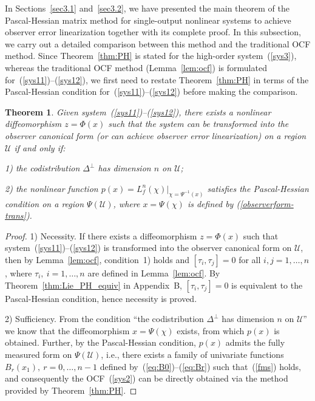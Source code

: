 \documentclass[11pt]{article}
\newtheorem{theorem}{Theorem}
\begin{document}
In Sections~\ref{sec3.1} and~\ref{sec3.2}, we have presented the main theorem of the Pascal-Hessian matrix method for single-output nonlinear systems to achieve observer error linearization together with its complete proof. In this subsection, we carry out a detailed comparison between this method and the traditional OCF method. Since Theorem~\ref{thm:PH} is stated for the high-order system~(\ref{sys3}), whereas the traditional OCF method (Lemma~\ref{lem:ocf}) is formulated for~(\ref{sys11})--(\ref{sys12}), we first need to restate Theorem~\ref{thm:PH} in terms of the Pascal-Hessian condition for~(\ref{sys11})--(\ref{sys12}) before making the comparison.
\begin{theorem}\label{thm:gene}
	Given system~(\ref{sys11})--(\ref{sys12}), there exists a nonlinear diffeomorphism $z=\Phi(x)$ such that the system can be transformed into the observer canonical form (or can achieve observer error linearization) on a region $\mathcal{U}$ if and only if: 
	
	1) the codistribution $\Delta^\perp$ has dimension $n$ on $\mathcal{U}$; 
	
	2) the nonlinear function $p(x)=L_f^n(\chi)\big|_{\chi=\Psi^{-1}(x)}$ satisfies the Pascal-Hessian condition on a region $\Psi(\mathcal{U})$, where $x=\Psi(\chi)$ is defined by (\ref{observerform-trans}).
\end{theorem}

\begin{proof}
	1) Necessity. If there exists a diffeomorphism $z=\Phi(x)$ such that system~(\ref{sys11})--(\ref{sys12}) is transformed into the observer canonical form on $\mathcal{U}$, then by Lemma~\ref{lem:ocf}, condition~1) holds and $[\tau_i,\tau_j]=0$ for all $i,j=1,\ldots,n$, where $\tau_i,~i=1,\ldots,n$ are defined in Lemma~\ref{lem:ocf}. By Theorem~\ref{thm:Lie_PH_equiv} in Appendix~B, $[\tau_i,\tau_j]=0$ is equivalent to the Pascal-Hessian condition, hence necessity is proved.
	
	2) Sufficiency. From the condition ``the codistribution $\Delta^\perp$ has dimension $n$ on $\mathcal{U}$'' we know that the diffeomorphism $x=\Psi(\chi)$ exists, from which $p(x)$ is obtained. Further, by the Pascal-Hessian condition, $p(x)$ admits the fully measured form on $\Psi(\mathcal{U})$, i.e., there exists a family of univariate functions $B_r(x_1),~r=0,\ldots,n-1$ defined by~(\ref{eq:B0})--(\ref{eq:Br}) such that~(\ref{fms}) holds, and consequently the OCF~(\ref{sys2}) can be directly obtained via the method provided by Theorem~\ref{thm:PH}.	
\end{proof}
\end{document}
